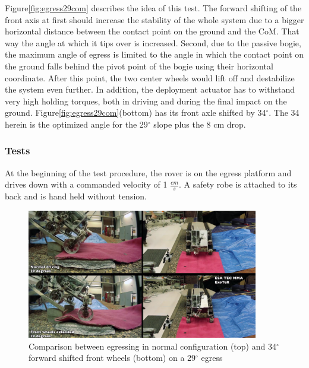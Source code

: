 \documentclass[a4paper,twocolumn]{esapub2005} %
\begin{document}
Figure\ref{fig:egress29com} describes the idea of this test. The forward shifting of the front axis at first should increase the stability of the whole system due to a bigger horizontal distance between the contact point on the ground and the CoM. That way the angle at which it tips over is increased. Second, due to the passive bogie, the maximum angle of egress is limited to the angle in which the contact point on the ground falls behind the pivot point of the bogie using their horizontal coordinate. After this point, the two center wheels would lift off and destabilize the system even further. In addition, the deployment actuator has to withstand very high holding torques, both in driving and during the final impact on the ground.
Figure\ref{fig:egress29com}(bottom) has its front axle shifted by 34$^\circ$. The 34 herein is the optimized angle for the 29$^\circ$ slope plus the 8 cm drop. 



\subsubsection{Tests}

At the beginning of the test procedure, the rover is on the egress platform and drives down with a commanded velocity of 1 $\frac{cm}{s}$. A safety robe is attached to its back and is hand held without tension. 

\begin{figure}[h!]
	\centering		\includegraphics[width=0.9\textwidth]{egress29.png}	
	\caption{Comparison between egressing in normal configuration (top) and 34$^{\circ}$ forward shifted front wheels (bottom) on a 29$^{\circ}$ egress}
	\label{fig:egress29}
\end{figure}
\end{document}
